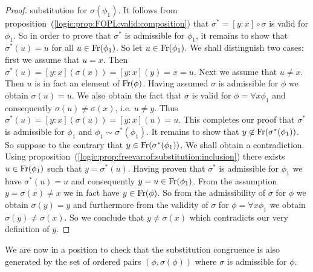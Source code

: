 \begin{proof}
substitution for $\sigma(\phi_{1})$. It follows from
proposition~(\ref{logic:prop:FOPL:valid:composition}) that
$\sigma^{*}=[y\!:\!x]\circ\sigma$ is valid for $\phi_{1}$. So in
order to prove that $\sigma^{*}$ is admissible for $\phi_{1}$, it
remains to show that $\sigma^{*}(u)=u$ for all
$u\in\mbox{\rm Fr}(\phi_{1})$. So let $u\in\mbox{\rm Fr}(\phi_{1})$. We shall
distinguish two cases: first we assume that $u=x$. Then
$\sigma^{*}(u)=[y\!:\!x](\sigma(x))=[y\!:\!x](y)=x=u$. Next we
assume that $u\neq x$. Then $u$ is in fact an element of
$\mbox{\rm Fr}(\phi)$. Having assumed $\sigma$ is admissible for $\phi$ we
obtain $\sigma(u)=u$. We also obtain the fact that $\sigma$ is valid
for $\phi=\forall x\phi_{1}$ and consequently
$\sigma(u)\neq\sigma(x)$, i.e. $u\neq y$. Thus
$\sigma^{*}(u)=[y\!:\!x](\sigma(u))=[y\!:\!x](u)=u$. This completes
our proof that $\sigma^{*}$ is admissible for $\phi_{1}$ and
$\phi_{1}\sim\sigma^{*}(\phi_{1})$. It remains to show that
$y\not\in\mbox{\rm Fr}(\sigma^{*}(\phi_{1}))$. So suppose to the contrary
that $y\in\mbox{\rm Fr}(\sigma^{*}(\phi_{1}))$. We shall obtain a
contradiction. Using
proposition~(\ref{logic:prop:freevar:of:substitution:inclusion})
there exists $u\in\mbox{\rm Fr}(\phi_{1})$ such that $y=\sigma^{*}(u)$.
Having proven that $\sigma^{*}$ is admissible for $\phi_{1}$ we have
$\sigma^{*}(u)=u$ and consequently $y=u\in\mbox{\rm Fr}(\phi_{1})$. From the
assumption $y=\sigma(x)\neq x$ we in fact have $y\in\mbox{\rm Fr}(\phi)$. So
from the admissibility of $\sigma$ for $\phi$ we obtain
$\sigma(y)=y$ and furthermore from the validity of $\sigma$ for
$\phi=\forall x\phi_{1}$ we obtain $\sigma(y)\neq\sigma(x)$. So we
conclude that $y\neq\sigma(x)$ which contradicts our very definition
of $y$.
\end{proof}

We are now in a position to check that the substitution congruence
is also generated by the set of ordered pairs $(\phi,\sigma(\phi))$
where $\sigma$ is admissible for $\phi$.

